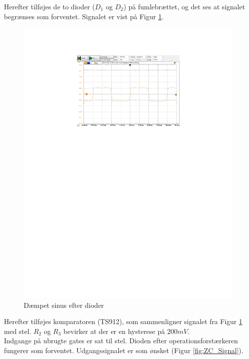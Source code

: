 Herefter tilføjes de to dioder ($D_{1}$ og $D_{2}$)\cite{lib:1N4148} på fumlebrættet, og det ses at signalet begrænses som forventet. Signalet er vist på Figur \ref{fig:ZC_Efter_Diode}.\\
\newpage
\begin{figure}[h]
	\centering
	\includegraphics[width={\textwidth},trim=150 505 145 80, clip=true]{../Implementering/billeder/efter_diode.pdf}
	\caption{Dæmpet sinus efter dioder}
	\label{fig:ZC_Efter_Diode}
\end{figure}

Herefter tilføjes komparatoren (TS912)\cite{lib:TS912}, som sammenligner signalet fra Figur \ref{fig:ZC_Efter_Diode} med stel. $R_{2}$ og $R_{3}$ bevirker at der er en hysterese på $200 mV$.\\
Indgange på ubrugte gates er sat til stel. Dioden efter operationsforstærkeren fungerer som forventet.
Udgangssignalet er som ønsket (Figur \ref{fig:ZC_Signal}).\\
 
